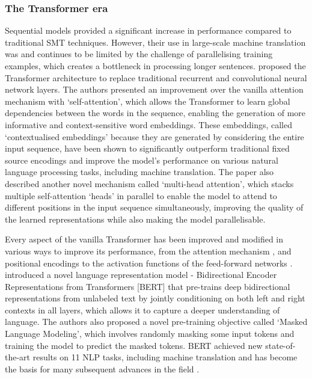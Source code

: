 \documentclass[11pt]{article}
\begin{document}
\subsubsection*{The Transformer era} \vspace{-2mm}
Sequential models provided a significant increase in performance compared to traditional SMT techniques.
However, their use in large-scale machine translation was and continues to be limited by the challenge of parallelising training examples, which creates a bottleneck in processing longer sentences.
\cite{vaswani2017attention} proposed the Transformer architecture to replace traditional recurrent and convolutional neural network layers.
The authors presented an improvement over the vanilla attention mechanism \citep{DBLP:journals/corr/BahdanauCB14} with `self-attention', which allows the Transformer to learn global dependencies between the words in the sequence, enabling the generation of more informative and context-sensitive word embeddings.
These embeddings, called `contextualised embeddings' because they are generated by considering the entire input sequence, have been shown to significantly outperform traditional fixed source encodings and improve the model's performance on various natural language processing tasks, including machine translation.
The paper also described another novel mechanism called `multi-head attention', which stacks multiple self-attention `heads' in parallel to enable the model to attend to different positions in the input sequence simultaneously, improving the quality of the learned representations while also making the model parallelisable.

Every aspect of the vanilla Transformer has been improved and modified in various ways to improve its performance, from the attention mechanism \citep{8894858,  guo2020multi}, and positional encodings \citep{devlin-etal-2019-bert, dai-etal-2019-transformer} to the activation functions of the feed-forward networks \citep{DBLP:conf/iclr/RamachandranZL18, chen2020generative}. 
\cite{devlin-etal-2019-bert} introduced a novel language representation model - Bidirectional Encoder Representations from Transformers [BERT] that pre-trains deep bidirectional representations from unlabeled text by jointly conditioning on both left and right contexts in all layers, which allows it to capture a deeper understanding of language.
The authors also proposed a novel pre-training objective called `Masked Language Modeling', which involves randomly masking some input tokens and training the model to predict the masked tokens.
BERT achieved new state-of-the-art results on 11 NLP tasks, including machine translation and has become the basis for many subsequent advances in the field \citep{lanalbert}.
\end{document}
